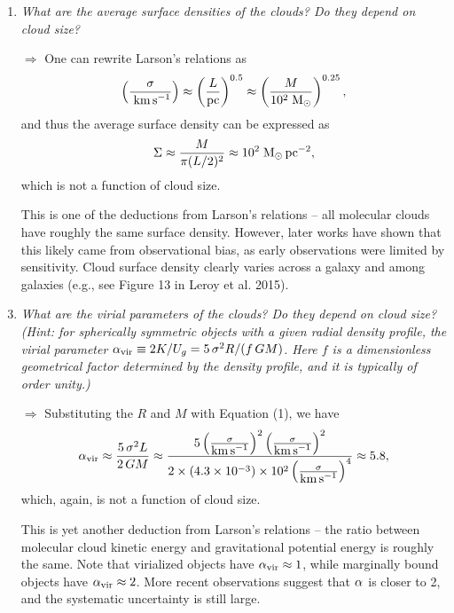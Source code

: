 \documentclass[12pt, letterpaper]{article}
\newcommand{\pc}{\mbox{$\rm pc$}}
\newcommand{\kms}{\mbox{$\rm km\,s^{-1}$}}
\newcommand{\Msun}{\mbox{$\rm M_\odot$}}
\begin{document}
\begin{enumerate}

\item {\it What are the average surface densities of the clouds? Do they depend on cloud size?}

\item[$\Rightarrow$] One can rewrite Larson's relations as
\begin{align}
    \left( \frac{\sigma}{\;\kms} \right) \approx
    \left( \frac{L}{\pc} \right)^{0.5} \approx \left( \frac{M}{10^2\;\Msun} \right)^{0.25},
\end{align}
and thus the average surface density can be expressed as
\begin{align}
    \Sigma
    \approx \frac{M}{\pi (L/2)^2}
    \approx 10^2\;\Msun\,\pc^{-2},
\end{align}
which is not a function of cloud size.

This is one of the deductions from Larson's relations -- all molecular clouds have roughly the same surface density. However, later works have shown that this likely came from observational bias, as early observations were limited by sensitivity. Cloud surface density clearly varies across a galaxy and among galaxies (e.g., see Figure 13 in Leroy et al. 2015).

\item {\it What are the virial parameters of the clouds? Do they depend on cloud size? (Hint: for spherically symmetric objects with a given radial density profile, the virial parameter $\alpha_{\rm vir} \equiv 2K/U_g = 5\,\sigma^2 R/(f\,G M)$. Here $f$ is a dimensionless geometrical factor determined by the density profile, and it is typically of order unity.)}

\item[$\Rightarrow$] Substituting the $R$ and $M$ with Equation (1), we have
\begin{align}
    \alpha_{\rm vir}
    \approx \frac{5\,\sigma^2 L}{2\,G M}
    \approx \frac{5 \left(\frac{\sigma}{\kms}\right)^2 \left(\frac{\sigma}{\kms}\right)^2}{2 \times (4.3 \times 10^{-3}) \times 10^2 \left(\frac{\sigma}{\kms}\right)^4}
    \approx 5.8,
\end{align}
which, again, is not a function of cloud size.

This is yet another deduction from Larson's relations -- the ratio between molecular cloud kinetic energy and gravitational potential energy is roughly the same. Note that virialized objects have $\alpha_{\rm vir} \approx 1$, while marginally bound objects have $\alpha_{\rm vir} \approx 2$. More recent observations suggest that $\alpha_{\rm}$ is closer to 2, and the systematic uncertainty is still large.


\end{enumerate}
\end{document}
